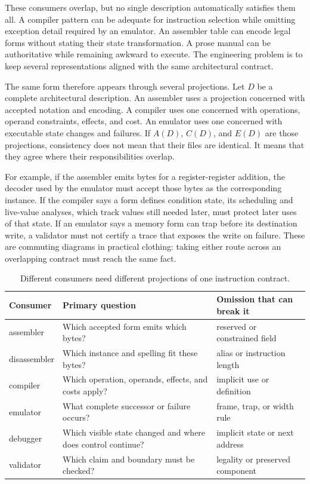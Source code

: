 These consumers overlap, but no single description automatically satisfies
them all. A compiler pattern can be adequate for instruction selection while
omitting exception detail required by an emulator. An assembler table can
encode legal forms without stating their state transformation. A prose manual
can be authoritative while remaining awkward to execute. The engineering
problem is to keep several representations aligned with the same architectural
contract.

The same form therefore appears through several projections. Let \(D\) be a
complete architectural description. An assembler uses a projection concerned
with accepted notation and encoding. A compiler uses one concerned with
operations, operand constraints, effects, and cost. An emulator uses one
concerned with executable state changes and failures. If \(A(D)\), \(C(D)\),
and \(E(D)\) are those projections, consistency does not mean that their files
are identical. It means that they agree where their responsibilities overlap.

For example, if the assembler emits bytes for a register-register addition,
the decoder used by the emulator must accept those bytes as the corresponding
instance. If the compiler says a form defines condition state, its scheduling
and live-value analyses, which track values still needed later, must protect
later uses of that state. If an emulator
says a memory form can trap before its destination write, a validator must not
certify a trace that exposes the write on failure. These are commuting
diagrams in practical clothing: taking either route across an overlapping
contract must reach the same fact.

\begin{table}
\centering
\caption{Different consumers need different projections of one instruction contract.}
\begin{tabular}{p{}p{}p{}}
\toprule
Consumer & Primary question & Omission that can break it \\
\midrule
assembler & Which accepted form emits which bytes? & reserved or constrained field \\
disassembler & Which instance and spelling fit these bytes? & alias or instruction length \\
compiler & Which operation, operands, effects, and costs apply? & implicit use or definition \\
emulator & What complete successor or failure occurs? & frame, trap, or width rule \\
debugger & Which visible state changed and where does control continue? & implicit state or next address \\
validator & Which claim and boundary must be checked? & legality or preserved component \\
\bottomrule
\end{tabular}
\end{table}

